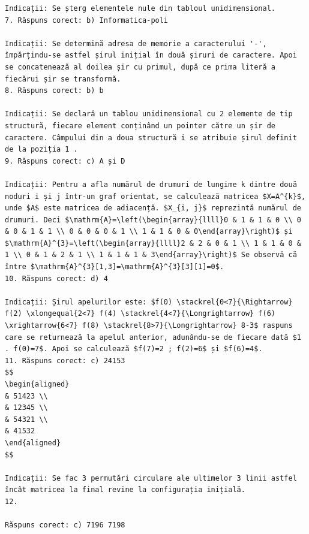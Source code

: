 \documentclass[10pt]{article}
\begin{document}
\begin{verbatim}
Indicații: Se șterg elementele nule din tabloul unidimensional.
7. Răspuns corect: b) Informatica-poli

Indicații: Se determină adresa de memorie a caracterului '-', împărțindu-se astfel șirul inițial în două șiruri de caractere. Apoi se concatenează al doilea șir cu primul, după ce prima literă a fiecărui șir se transformă.
8. Răspuns corect: b) b

Indicații: Se declară un tablou unidimensional cu 2 elemente de tip structură, fiecare element conținând un pointer către un șir de caractere. Câmpului din a doua structură i se atribuie șirul definit de la poziția 1 .
9. Răspuns corect: c) A și D

Indicații: Pentru a afla numărul de drumuri de lungime k dintre două noduri i și j într-un graf orientat, se calculează matricea $X=A^{k}$, unde $A$ este matricea de adiacență. $X_{i, j}$ reprezintă numărul de drumuri. Deci $\mathrm{A}=\left(\begin{array}{llll}0 & 1 & 1 & 0 \\ 0 & 0 & 1 & 1 \\ 0 & 0 & 0 & 1 \\ 1 & 1 & 0 & 0\end{array}\right)$ și $\mathrm{A}^{3}=\left(\begin{array}{llll}2 & 2 & 0 & 1 \\ 1 & 1 & 0 & 1 \\ 0 & 1 & 2 & 1 \\ 1 & 1 & 1 & 3\end{array}\right)$ Se observă că între $\mathrm{A}^{3}[1,3]=\mathrm{A}^{3}[3][1]=0$.
10. Răspuns corect: d) 4

Indicații: Șirul apelurilor este: $f(0) \stackrel{0<7}{\Rightarrow} f(2) \xlongequal{2<7} f(4) \stackrel{4<7}{\Longrightarrow} f(6) \xrightarrow{6<7} f(8) \stackrel{8>7}{\Longrightarrow} 8-3$ raspuns care se returnează la apelul anterior, adunându-se de fiecare dată $1 . f(0)=7$. Apoi se calculează $f(7)=2 ; f(2)=6$ și $f(6)=4$.
11. Răspuns corect: c) 24153
$$
\begin{aligned}
& 51423 \\
& 12345 \\
& 54321 \\
& 41532
\end{aligned}
$$

Indicații: Se fac 3 permutări circulare ale ultimelor 3 linii astfel încât matricea la final revine la configurația inițială.
12.

Răspuns corect: c) 7196 7198


\end{verbatim}
\end{document}
